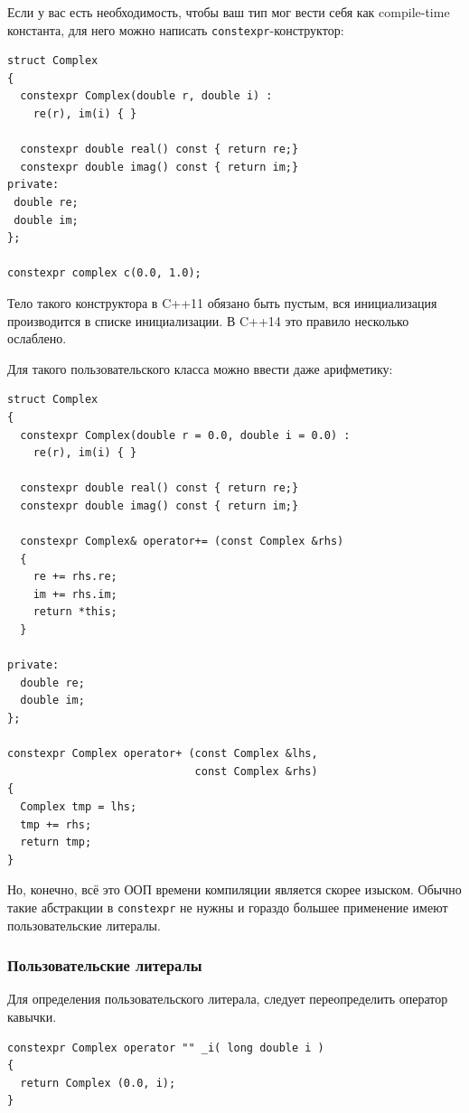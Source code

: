 \documentclass[a4paper,12pt,oneside]{article}
\begin{document}
Если у вас есть необходимость, чтобы ваш тип мог вести себя как compile-time константа, для него можно написать \lstinline!constexpr!-конструктор:

\begin{lstlisting}
struct Complex
{
  constexpr Complex(double r, double i) : 
    re(r), im(i) { }

  constexpr double real() const { return re;}
  constexpr double imag() const { return im;}
private:
 double re;
 double im;
};

constexpr complex c(0.0, 1.0);
\end{lstlisting}

Тело такого конструктора в C++11 обязано быть пустым, вся инициализация производится в списке инициализации. В C++14 это правило несколько ослаблено.

Для такого пользовательского класса можно ввести даже арифметику:

\begin{lstlisting}
struct Complex
{
  constexpr Complex(double r = 0.0, double i = 0.0) : 
    re(r), im(i) { }

  constexpr double real() const { return re;}
  constexpr double imag() const { return im;}

  constexpr Complex& operator+= (const Complex &rhs)
  {
    re += rhs.re;
    im += rhs.im;
    return *this;
  }

private:
  double re;
  double im;
};

constexpr Complex operator+ (const Complex &lhs, 
                             const Complex &rhs)
{
  Complex tmp = lhs;
  tmp += rhs;
  return tmp;
}
\end{lstlisting}

Но, конечно, всё это ООП времени компиляции является скорее изыском. Обычно такие абстракции в \lstinline!constexpr! не нужны и гораздо большее применение имеют пользовательские литералы.

\subsubsection{Пользовательские литералы}\label{Constexpr:userliterals}

Для определения пользовательского литерала, следует переопределить оператор кавычки.

\begin{lstlisting}
constexpr Complex operator "" _i( long double i )
{
  return Complex (0.0, i);
}
\end{lstlisting}
\end{document}
